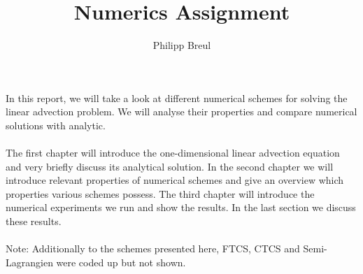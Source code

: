 \documentclass[11pt,a4paper,onecolumn]{article}
\author{Philipp Breul}
\title{Numerics Assignment}
\numberwithin{equation}{section} %
\begin{document}
\maketitle
In this report, we will take a look at different numerical schemes for solving the linear advection problem. We will analyse their properties and compare numerical solutions with analytic. \\ \\
The first chapter will introduce the one-dimensional linear advection equation and very briefly discuss its analytical solution. In the second chapter we will introduce relevant properties of numerical schemes and give an overview which properties various schemes possess. The third chapter will introduce the numerical experiments we run and show the results.  In the last section we discuss these results. \\ \\
Note: Additionally to the schemes presented here, FTCS, CTCS and Semi-Lagrangien were coded up but not shown.




\FloatBarrier
{}

\end{document}
